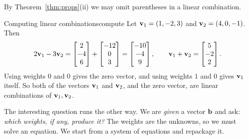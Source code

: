 \documentclass[11pt]{article}
\begin{document}
By Theorem~\ref{thm:props}(ii) we may omit parentheses in a linear combination.

\begin{exmp}{Computing linear combinations}{compute}
Let $\mathbf{v}_1=(1,-2,3)$ and $\mathbf{v}_2=(4,0,-1)$. Then
\[
2\mathbf{v}_1-3\mathbf{v}_2=\begin{bmatrix}2\\-4\\6\end{bmatrix}+\begin{bmatrix}-12\\0\\3\end{bmatrix}
=\begin{bmatrix}-10\\-4\\9\end{bmatrix},\qquad
\mathbf{v}_1+\mathbf{v}_2=\begin{bmatrix}5\\-2\\2\end{bmatrix}.
\]
Using weights $0$ and $0$ gives the zero vector, and using weights $1$ and $0$ gives $\mathbf{v}_1$ itself. So both of the vectors
$\mathbf{v}_1$ and $\mathbf{v}_2$, and the zero vector, are linear combinations of $\mathbf{v}_1,\mathbf{v}_2$.
\end{exmp}

The interesting question runs the other way. We are \emph{given} a vector $\mathbf{b}$ and ask: \emph{which weights, if any,
produce it?} The weights are the unknowns, so we must solve an equation. We start from a system of equations and
repackage it.
\end{document}
